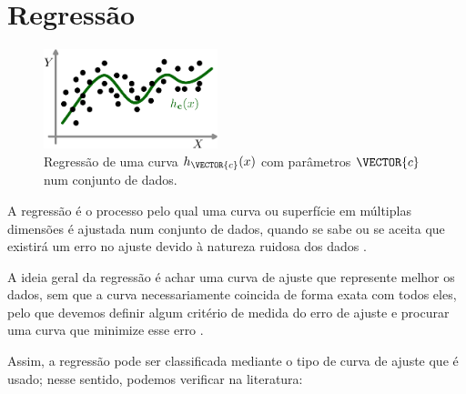 \section{Regressão}


\begin{figure}
     \centering
     \includegraphics[width=0.45\textwidth]{chapters/notacao/regressao1.eps}
     \caption{Regressão de uma curva $h_{\VECTOR{c}}(x)$ com parâmetros $\VECTOR{c}$ num conjunto de dados. }
     \label{fig:regressao:1}
    \hspace{20pt}
\end{figure}
A regressão é o processo pelo qual uma curva ou superfície em múltiplas dimensões é 
ajustada num conjunto de dados, quando se sabe ou se aceita que existirá um erro no ajuste
devido à natureza ruidosa dos dados \cite[pp. 5]{chapra2016metodos}.

A ideia geral da regressão é achar uma curva de ajuste que represente melhor 
os dados, sem que a curva necessariamente coincida de forma exata com todos eles,
pelo que devemos definir algum critério de medida do erro de ajuste 
e procurar uma curva que minimize esse erro \cite[pp. 7]{chapra2016metodos}.

Assim, a regressão pode ser classificada mediante o tipo de curva de ajuste que é usado;
nesse sentido, podemos verificar na literatura:

